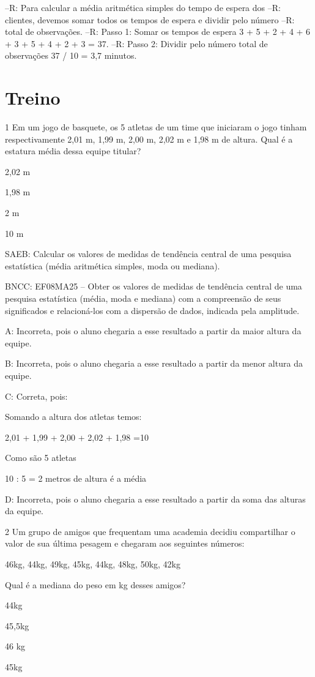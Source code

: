 {--R: Para calcular a média aritmética simples do tempo de espera dos
--R: clientes, devemos somar todos os tempos de espera e dividir pelo número
--R: total de observações.
--R: Passo 1: Somar os tempos de espera 3 + 5 + 2 + 4 + 6 + 3 + 5 + 4 + 2 + 3 = 37.
--R: Passo 2: Dividir pelo número total de observações 37 / 10 = 3,7 minutos.

\section{Treino}

\num{1} Em um jogo de basquete, os 5 atletas de um time que iniciaram o jogo
tinham respectivamente 2,01 m, 1,99 m, 2,00 m, 2,02 m e 1,98 m de
altura. Qual é a estatura média dessa equipe titular?
\item 2,02 m
\item 1,98 m
\item 2 m
\item 10 m

SAEB: Calcular os valores de medidas de tendência central de uma
pesquisa estatística (média aritmética simples, moda ou mediana).

BNCC: EF08MA25 -- Obter os valores de medidas de tendência central de
uma pesquisa estatística (média, moda e mediana) com a compreensão de
seus significados e relacioná-los com a dispersão de dados, indicada
pela amplitude.

A: Incorreta, pois o aluno chegaria a esse resultado a partir da maior
altura da equipe.

B: Incorreta, pois o aluno chegaria a esse resultado a partir da menor
altura da equipe.

C: Correta, pois:

Somando a altura dos atletas temos:

2,01 + 1,99 + 2,00 + 2,02 + 1,98 =10

Como são 5 atletas

10 : 5 = 2 metros de altura é a média

D: Incorreta, pois o aluno chegaria a esse resultado a partir da soma
das alturas da equipe.

\num{2} Um grupo de amigos que frequentam uma academia decidiu compartilhar o
valor de sua última pesagem e chegaram aos seguintes números:

46kg, 44kg, 49kg, 45kg, 44kg, 48kg, 50kg, 42kg

Qual é a mediana do peso em kg desses amigos?
\item 44kg
\item 45,5kg
\item 46 kg
\item 45kg

}
